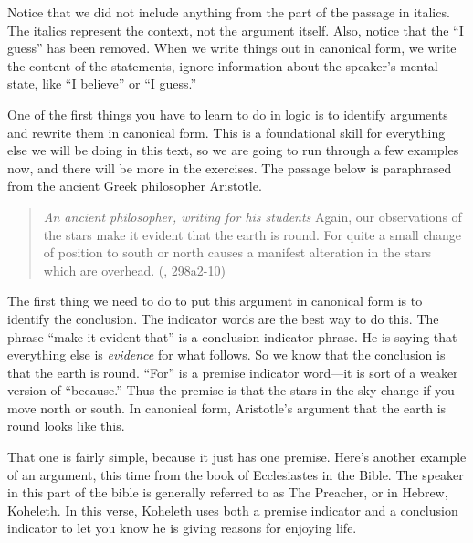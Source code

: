 \begin{kormanize}
\end{kormanize}

Notice that we did not include anything from the part of the passage in italics. The italics represent the context, not the argument itself. Also, notice that the ``I guess'' has been removed. When we write things out in canonical form, we write the content of the statements, ignore information about the speaker's mental state, like ``I believe'' or ``I guess.''

One of the first things you have to learn to do in logic is to identify arguments and rewrite them in canonical form. This is a foundational skill for everything else we will be doing in this text, so we are going to run through a few examples now, and there will be more in the exercises. The passage below is paraphrased from the ancient Greek philosopher Aristotle.

\begin{quotation}\noindent \textit{An ancient philosopher, writing for his students} Again, our observations of the stars make it evident that the earth is round. For quite a small change of position to south or north causes a manifest alteration in the stars which are overhead. (\cite{Aristotle:heavens}, 298a2-10)
\label{on_the_heavens} \end{quotation}

The first thing we need to do to put this argument in canonical form is to identify the conclusion. The indicator words are the best way to do this. The phrase ``make it evident that'' is a conclusion indicator phrase. He is saying that everything else is \textit{evidence} for what follows. So we know that the conclusion is that the earth is round. ``For'' is a premise indicator word---it is sort of a weaker version of ``because.''  Thus the premise is that the stars in the sky change if you move north or south. In canonical form, Aristotle's argument that the earth is round looks like this.\\


\begin{kormanize}
\end{kormanize}

That one is fairly simple, because it just has one premise. Here's another example of an argument, this time from the book of Ecclesiastes in the Bible. The speaker in this part of the bible is generally referred to as The Preacher, or in Hebrew, Koheleth. In this verse, Koheleth uses both a premise indicator and a conclusion indicator to let you know he is giving reasons for enjoying life.

